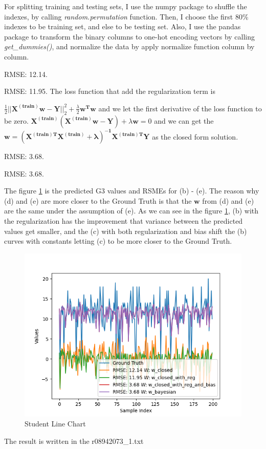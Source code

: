 \documentclass{../../Latex_Template/Homework/homework}
\begin{document}
\maketitle

  \begin{alphaparts}
    \questionpart
    For splitting training and testing sets, I use the numpy package to shuffle
    the indexes, by calling \emph{random.permutation} function. Then, I choose
    the first 80\% indexes to be training set, and else to be testing set. Also,
    I use the pandas package to transform the binary columns to one-hot encoding
    vectors by calling \emph{get\_dummies()}, and normalize the data by apply
    normalize function column by column.

    \questionpart
    RMSE: 12.14.

    \questionpart
    RMSE: 11.95. The loss function that add the regularization term is 

    \questionpart
    $\frac{1}{2}||\boldsymbol{X^{(train)}w - Y}||^2_2 + \frac{\lambda}{2}
    \boldsymbol{w^T w}$
    and we let the first derivative of the loss function to be zero. $ 
    \boldsymbol{X^{(train)} (X^{(train)}w - Y)} + \lambda \boldsymbol{w} = 0$
    and we can get the $\boldsymbol{w = (X^{(train)T} X^{(train)} + \lambda
    )^{-1}  X^{(train)T} Y}$ as the closed form solution.

    \questionpart
    RMSE: 3.68.

    \questionpart
    RMSE: 3.68.

    \questionpart
    The figure \ref{fig:student_line_chart} is the predicted G3 values and
    RSMEs for (b) - (e). The reason why (d) and (e) are more closer to the
    Ground Truth is that the $\boldsymbol{w}$ from (d) and (e) are the same
    under the assumption of (e). As we can see in the figure
    \ref{fig:student_line_chart}, (b) with the regularization has the
    improvement that variance between the predicted values get smaller, and the
    (c) with both regularization and bias shift the (b) curves with constants
    letting (c) to be more closer to the Ground Truth. 
    \begin{figure}[h]
      \centering
      \includegraphics[width=0.5\linewidth]{student_line_chart}
      \caption{Student Line Chart}
      \label{fig:student_line_chart}
    \end{figure}

    \questionpart
    The result is written in the r08942073\_1.txt
  \end{alphaparts}
        
\end{document}
